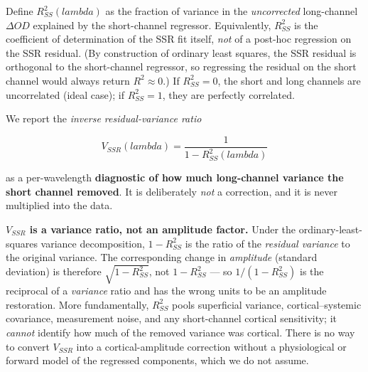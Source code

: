 \documentclass[12pt]{article}
\def\lambda{lambda}%
\def\mathrm#1{#1}%
\begin{document}
Define $R^2_{\mathrm{SS}}(\lambda)$ as the fraction of variance in the \emph{uncorrected} long-channel $\Delta\mathrm{OD}$ explained by the short-channel regressor. Equivalently, $R^2_{\mathrm{SS}}$ is the coefficient of determination of the SSR fit itself, \emph{not} of a post-hoc regression on the SSR residual. (By construction of ordinary least squares, the SSR residual is orthogonal to the short-channel regressor, so regressing the residual on the short channel would always return $R^2 \approx 0$.) If $R^2_{\mathrm{SS}} = 0$, the short and long channels are uncorrelated (ideal case); if $R^2_{\mathrm{SS}} = 1$, they are perfectly correlated.

We report the \emph{inverse residual-variance ratio}

\begin{equation}
V_{\mathrm{SSR}}(\lambda) = \frac{1}{1 - R^2_{\mathrm{SS}}(\lambda)}
\label{eq:vssr}
\end{equation}

as a per-wavelength \textbf{diagnostic of how much long-channel variance the short channel removed}. It is deliberately \emph{not} a correction, and it is never multiplied into the data.

\begin{keyinsight}
\textbf{$V_{\mathrm{SSR}}$ is a variance ratio, not an amplitude factor.} Under the ordinary-least-squares variance decomposition, $1 - R^2_{\mathrm{SS}}$ is the ratio of the \emph{residual variance} to the original variance. The corresponding change in \emph{amplitude} (standard deviation) is therefore $\sqrt{1 - R^2_{\mathrm{SS}}}$, not $1 - R^2_{\mathrm{SS}}$ --- so $1/(1-R^2_{\mathrm{SS}})$ is the reciprocal of a \emph{variance} ratio and has the wrong units to be an amplitude restoration. More fundamentally, $R^2_{\mathrm{SS}}$ pools superficial variance, cortical--systemic covariance, measurement noise, and any short-channel cortical sensitivity; it \emph{cannot} identify how much of the removed variance was cortical. There is no way to convert $V_{\mathrm{SSR}}$ into a cortical-amplitude correction without a physiological or forward model of the regressed components, which we do not assume.
\end{keyinsight}
\end{document}
